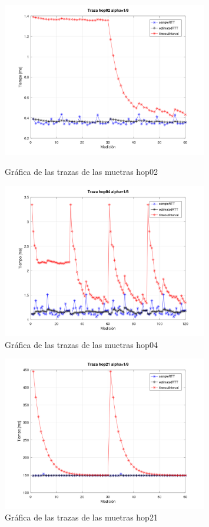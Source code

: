 \begin{figure}[H]
	\centering
	\includegraphics[width=0.8\textwidth]{img/alpha18/trazahop02.png}
	\caption{Gr\'afica de las trazas de las muetras hop02}
    
	\includegraphics[width=0.8\textwidth]{img/alpha18/trazaHop04.png}
	\caption{Gr\'afica de las trazas de las muetras hop04}
\end{figure}

\begin{figure}[H]
	\centering
	\includegraphics[width=0.8\textwidth]{img/alpha18/trazaHop21.png}
	\caption{Gr\'afica de las trazas de las muetras hop21}
	\label{fig:hop21Graph}
\end{figure}

